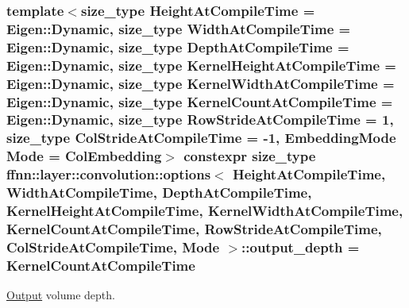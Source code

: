 \hypertarget{structffnn_1_1layer_1_1convolution_1_1options_a7efc40f0f1fccd6267ac93acd9c3fe05}{
\subsubsection[{output\-\_\-depth}]{\setlength{\rightskip}{0pt plus 5cm}template$<$size\-\_\-type Height\-At\-Compile\-Time = Eigen\-::\-Dynamic, size\-\_\-type Width\-At\-Compile\-Time = Eigen\-::\-Dynamic, size\-\_\-type Depth\-At\-Compile\-Time = Eigen\-::\-Dynamic, size\-\_\-type Kernel\-Height\-At\-Compile\-Time = Eigen\-::\-Dynamic, size\-\_\-type Kernel\-Width\-At\-Compile\-Time = Eigen\-::\-Dynamic, size\-\_\-type Kernel\-Count\-At\-Compile\-Time = Eigen\-::\-Dynamic, size\-\_\-type Row\-Stride\-At\-Compile\-Time = 1, size\-\_\-type Col\-Stride\-At\-Compile\-Time = -\/1, Embedding\-Mode Mode = Col\-Embedding$>$ constexpr {\bf size\-\_\-type} {\bf ffnn\-::layer\-::convolution\-::options}$<$ Height\-At\-Compile\-Time, Width\-At\-Compile\-Time, Depth\-At\-Compile\-Time, Kernel\-Height\-At\-Compile\-Time, Kernel\-Width\-At\-Compile\-Time, Kernel\-Count\-At\-Compile\-Time, Row\-Stride\-At\-Compile\-Time, Col\-Stride\-At\-Compile\-Time, Mode $>$\-::output\-\_\-depth = Kernel\-Count\-At\-Compile\-Time\hspace{0.3cm}{\ttfamily [static]}}}\label{structffnn_1_1layer_1_1convolution_1_1options_a7efc40f0f1fccd6267ac93acd9c3fe05}


\hyperlink{classffnn_1_1layer_1_1_output}{Output} volume depth. 


